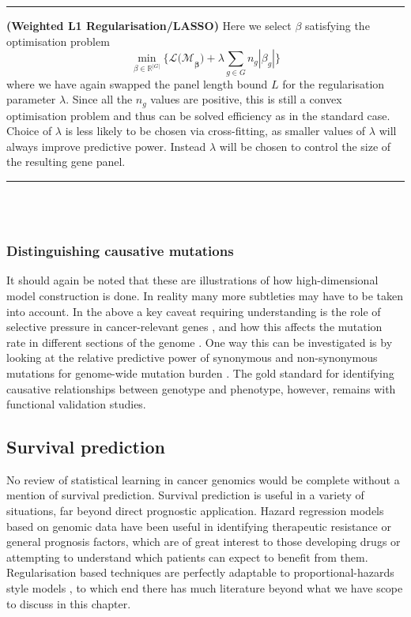 \documentclass[thesis.tex]{subfiles}
\begin{document}
\hrule
\begin{technique}{\textbf{(Weighted L1 Regularisation/LASSO)}} 
Here we select $\beta$ satisfying the optimisation problem
$$\min_{\beta \in \mathbb{R}^{|G|}} \{\mathcal{L(M}_\mathbf{\beta}) + \lambda\sum\limits_{g \in G}n_g|\beta_g| \} $$
where we have again swapped the panel length bound $L$ for the regularisation parameter $\lambda$. Since all the $n_g$ values are positive, this is still a convex optimisation problem and thus can be solved efficiency as in the standard case. Choice of $\lambda$ is less likely to be chosen via cross-fitting, as smaller values of $\lambda$ will always improve predictive power. Instead $\lambda$ will be chosen to control the size of the resulting gene panel.

\end{technique}
\hrule
~\\~\\

\subsubsection{Distinguishing causative mutations}
It should again be noted that these are illustrations of how high-dimensional model construction is done. In reality many more subtleties may have to be taken into account. In the above a key caveat requiring understanding is the role of selective pressure in cancer-relevant genes \citep{bull_unlocking_2013}, and how this affects the mutation rate in different sections of the genome \citep{iengar_identifying_2018}. One way this can be investigated is by looking at the relative predictive power of synonymous and non-synonymous mutations for genome-wide mutation burden \citep{chu_nonsynonymous_2019}. The gold standard for identifying causative relationships between genotype and phenotype, however, remains with functional validation studies.

\subsection{Survival prediction \label{sec:intro_survival}}
No review of statistical learning in cancer genomics would be complete without a mention of survival prediction. Survival prediction is useful in a variety of situations, far beyond direct prognostic application. Hazard regression models based on genomic data have been useful in identifying therapeutic resistance \citep{seagle_discovery_2016} or general prognosis \citep{guinney_prediction_2017, zhang_lassobased_2018} factors, which are of great interest to those developing drugs or attempting to understand which patients can expect to benefit from them. Regularisation based techniques are perfectly adaptable to proportional-hazards style models \citep{benner_high-dimensional_2010}, to which end there has much literature beyond what we have scope to discuss in this chapter. 
\end{document}
